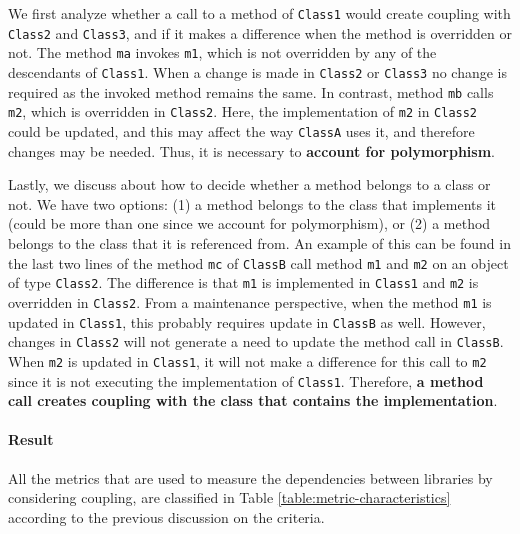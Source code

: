 We first analyze whether a call to a method of \texttt{Class1} would create coupling with \texttt{Class2} and \texttt{Class3}, and if it makes a difference when the method is overridden or not. The method \texttt{ma} invokes \texttt{m1}, which is not overridden by any of the descendants of \texttt{Class1}. When a change is made in \texttt{Class2} or \texttt{Class3} no change is required as the invoked method remains the same. In contrast, method \texttt{mb} calls \texttt{m2}, which is overridden in \texttt{Class2}. Here, the implementation of \texttt{m2} in \texttt{Class2} could be updated, and this may affect the way \texttt{ClassA} uses it, and therefore changes may be needed. Thus, it is necessary to \textbf{account for polymorphism}.

Lastly, we discuss about how to decide whether a method belongs to a class or not. We have two options: (1) a method belongs to the class that implements it (could be more than one since we account for polymorphism), or (2) a method belongs to the class that it is referenced from. An example of this can be found in the last two lines of the method \texttt{mc} of \texttt{ClassB} call method \texttt{m1} and \texttt{m2} on an object of type \texttt{Class2}. The difference is that \texttt{m1} is implemented in \texttt{Class1} and \texttt{m2} is overridden in \texttt{Class2}. From a maintenance perspective, when the method \texttt{m1} is updated in \texttt{Class1}, this probably requires update in \texttt{ClassB} as well. However, changes in \texttt{Class2} will not generate a need to update the method call in \texttt{ClassB}. When  \texttt{m2} is updated in \texttt{Class1}, it will not make a difference for this call to \texttt{m2} since it is not executing the implementation of \texttt{Class1}. Therefore, \textbf{a method call creates coupling with the class that contains the implementation}.

\paragraph{Result}
All the metrics that are used to measure the dependencies between libraries by considering coupling, are classified in Table \ref{table:metric-characteristics} according to the previous discussion on the criteria.

